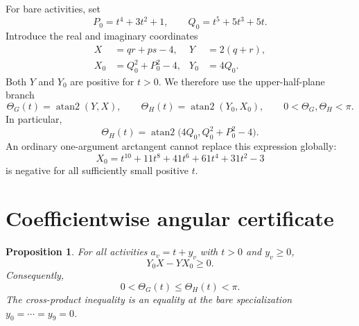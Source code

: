 \documentclass[11pt]{article}
\newtheorem{proposition}[theorem]{Proposition}
\theoremstyle{remark}
\begin{document}
For bare activities, set
\begin{equation}\label{eq:bare-PQ}
 P_0=t^4+3t^2+1,
 \qquad Q_0=t^5+5t^3+5t.
\end{equation}
Introduce the real and imaginary coordinates
\begin{align*}
 X&=qr+ps-4,&Y&=2(q+r),\\
 X_0&=Q_0^2+P_0^2-4,&Y_0&=4Q_0.
\end{align*}
Both $Y$ and $Y_0$ are positive for $t>0$.  We therefore use the
upper-half-plane branch
\begin{equation}\label{eq:phases}
 \Theta_G(t)=\operatorname{atan2}(Y,X),
 \qquad
 \Theta_H(t)=\operatorname{atan2}(Y_0,X_0),
 \qquad 0<\Theta_G,\Theta_H<\pi.
\end{equation}
In particular,
\begin{equation}\label{eq:bare-phase}
 \Theta_H(t)=\operatorname{atan2}
 \bigl(4Q_0,Q_0^2+P_0^2-4\bigr).
\end{equation}
An ordinary one-argument arctangent cannot replace this expression globally:
\[
 X_0=t^{10}+11t^8+41t^6+61t^4+31t^2-3
\]
is negative for all sufficiently small positive $t$.

\section{Coefficientwise angular certificate}

\begin{proposition}\label{prop:certificate}
For all activities $a_v=t+y_v$ with $t>0$ and $y_v\geq0$,
\begin{equation}\label{eq:cross-product}
 Y_0X-YX_0\geq0.
\end{equation}
Consequently,
\begin{equation}\label{eq:phase-comparison}
 0<\Theta_G(t)\leq\Theta_H(t)<\pi.
\end{equation}
The cross-product inequality is an equality at the bare specialization
$y_0=\cdots=y_9=0$.
\end{proposition}
\end{document}
